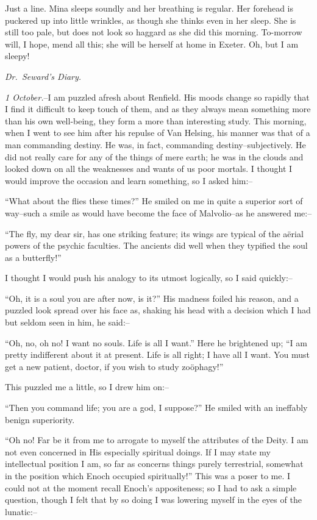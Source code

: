 \documentclass[12pt,openright]{book}
\begin{document}
Just a line. Mina sleeps soundly and her breathing is regular. Her forehead is puckered up into little wrinkles, as though she thinks even in her sleep. She is still too pale, but does not look so haggard as she did this morning. To-morrow will, I hope, mend all this; she will be herself at home in Exeter. Oh, but I am sleepy!

\textit{Dr. Seward’s Diary.}

\textit{1 October.}–I am puzzled afresh about Renfield. His moods change so rapidly that I find it difficult to keep touch of them, and as they always mean something more than his own well-being, they form a more than interesting study. This morning, when I went to see him after his repulse of Van Helsing, his manner was that of a man commanding destiny. He was, in fact, commanding destiny–subjectively. He did not really care for any of the things of mere earth; he was in the clouds and looked down on all the weaknesses and wants of us poor mortals. I thought I would improve the occasion and learn something, so I asked him:–

“What about the flies these times?” He smiled on me in quite a superior sort of way–such a smile as would have become the face of Malvolio–as he answered me:–

“The fly, my dear sir, has one striking feature; its wings are typical of the aërial powers of the psychic faculties. The ancients did well when they typified the soul as a butterfly!”

I thought I would push his analogy to its utmost logically, so I said quickly:–

“Oh, it is a soul you are after now, is it?” His madness foiled his reason, and a puzzled look spread over his face as, shaking his head with a decision which I had but seldom seen in him, he said:–

“Oh, no, oh no! I want no souls. Life is all I want.” Here he brightened up; “I am pretty indifferent about it at present. Life is all right; I have all I want. You must get a new patient, doctor, if you wish to study zoöphagy!”

This puzzled me a little, so I drew him on:–

“Then you command life; you are a god, I suppose?” He smiled with an ineffably benign superiority.

“Oh no! Far be it from me to arrogate to myself the attributes of the Deity. I am not even concerned in His especially spiritual doings. If I may state my intellectual position I am, so far as concerns things purely terrestrial, somewhat in the position which Enoch occupied spiritually!” This was a poser to me. I could not at the moment recall Enoch’s appositeness; so I had to ask a simple question, though I felt that by so doing I was lowering myself in the eyes of the lunatic:–
\end{document}
